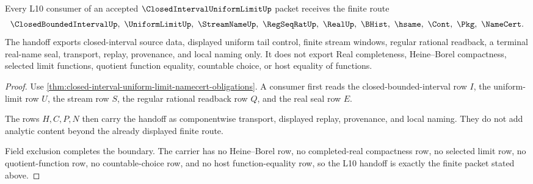 \begin{theorem}
\label{thm:closed-interval-uniform-limit-l10-handoff}
Every L10 consumer of an accepted $\ClosedIntervalUniformLimitUp$ packet receives the finite route
$$
\ClosedBoundedIntervalUp,\ \UniformLimitUp,\ \StreamNameUp,\ \RegSeqRatUp,\ \RealUp,\ \BHist,\ \hsame,\ \Cont,\ \Pkg,\ \NameCert .
$$
The handoff exports closed-interval source data, displayed uniform tail control, finite stream windows, regular rational readback, a terminal real-name seal, transport, replay, provenance, and local naming only. It does not export Real completeness, Heine--Borel compactness, selected limit functions, quotient function equality, countable choice, or host equality of functions.
\end{theorem}
\begin{proof}
Use \autoref{thm:closed-interval-uniform-limit-namecert-obligations}. A consumer first reads the closed-bounded-interval row $I$, the uniform-limit row $U$, the stream row $S$, the regular rational readback row $Q$, and the real seal row $E$.

The rows $H,C,P,N$ then carry the handoff as componentwise transport, displayed replay, provenance, and local naming. They do not add analytic content beyond the already displayed finite route.

Field exclusion completes the boundary. The carrier has no Heine--Borel row, no completed-real compactness row, no selected limit row, no quotient-function row, no countable-choice row, and no host function-equality row, so the L10 handoff is exactly the finite packet stated above.
\end{proof}



